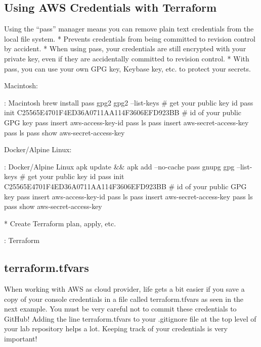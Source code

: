 \subsection{Using AWS Credentials with Terraform}
\justify{}
 Using the ``pass'' manager means you can remove plain text credentials
  from the local file system.
  * Prevents credentials from being committed to revision control by accident.
  * When using pass, your credentials are still encrypted with your private key, even
    if they are accidentally committed to revision control.
  * With pass, you can use your own GPG key, Keybase key, etc. to protect
    your secrets.

Macintosh:

\begin{mybox}{\thetcbcounter: Macintosh}
brew install pass gpg2
gpg2 --list-keys # get your public key id
pass init C25565E4701F4ED36A0711AA114F3606EFD923BB # id of your public GPG key
pass insert aws-access-key-id
pass ls
pass insert aws-secret-access-key
pass ls
pass show aws-secret-access-key
\end{mybox}

Docker/Alpine Linux:

\begin{mybox}{\thetcbcounter: Docker/Alpine Linux}
apk update && apk add --no-cache pass gnupg
gpg --list-keys # get your public key id
pass init C25565E4701F4ED36A0711AA114F3606EFD923BB # id of your public GPG key
pass insert aws-access-key-id
pass ls
pass insert aws-secret-access-key
pass ls
pass show aws-secret-access-key
\end{mybox}

* Create Terraform plan, apply, etc.

\begin{mybox}{\thetcbcounter: Terraform}
  
\end{mybox}

\subsection{terraform.tfvars}
\justify{}
When working with AWS as cloud provider, life gets a bit easier if you
save a copy of your console credentials in a file called
terraform.tfvars as seen in the next example. You must be very careful
not to commit these credentials to GitHub! Adding the line
terraform.tfvars to your .gitignore file at the top level of your lab
repository helps a lot. Keeping track of your credentials is very
important!

